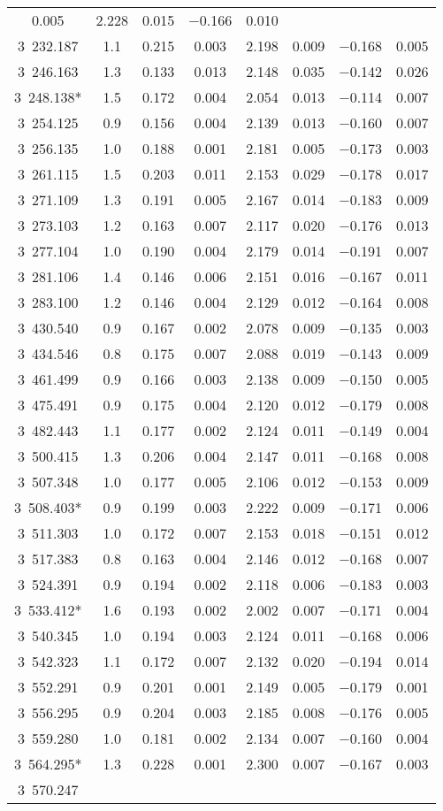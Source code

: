 \begin{table}
\begin{tabular}{cccccccc}
0.005 & 2.228 & 0.015 & $-$0.166 & 0.010 \\ 3~232.187 & 1.1 & 0.215 & 0.003 & 2.198 & 0.009 & $-$0.168 & 0.005 \\ 3~246.163 & 1.3 & 0.133 & 0.013 & 2.148 & 0.035 & $-$0.142 & 0.026 \\ 3~248.138* & 1.5 & 0.172 & 0.004 & 2.054 & 0.013 & $-$0.114 & 0.007 \\ 3~254.125 & 0.9 & 0.156 & 0.004 & 2.139 & 0.013 & $-$0.160 & 0.007 \\ 3~256.135 & 1.0 & 0.188 & 0.001 & 2.181 & 0.005 & $-$0.173 & 0.003 \\ 3~261.115 & 1.5 & 0.203 & 0.011 & 2.153 & 0.029 & $-$0.178 & 0.017 \\ 3~271.109 & 1.3 & 0.191 & 0.005 & 2.167 & 0.014 & $-$0.183 & 0.009 \\ 3~273.103 & 1.2 & 0.163 & 0.007 & 2.117 & 0.020 & $-$0.176 & 0.013 \\ 3~277.104 & 1.0 & 0.190 & 0.004 & 2.179 & 0.014 & $-$0.191 & 0.007 \\ 3~281.106 & 1.4 & 0.146 & 0.006 & 2.151 & 0.016 & $-$0.167 & 0.011 \\ 3~283.100 & 1.2 & 0.146 & 0.004 & 2.129 & 0.012 & $-$0.164 & 0.008 \\ 3~430.540 & 0.9 & 0.167 & 0.002 & 2.078 & 0.009 & $-$0.135 & 0.003 \\ 3~434.546 & 0.8 & 0.175 & 0.007 & 2.088 & 0.019 & $-$0.143 & 0.009 \\ 3~461.499 & 0.9 & 0.166 & 0.003 & 2.138 & 0.009 & $-$0.150 & 0.005 \\ 3~475.491 & 0.9 & 0.175 & 0.004 & 2.120 & 0.012 & $-$0.179 & 0.008 \\ 3~482.443 & 1.1 & 0.177 & 0.002 & 2.124 & 0.011 & $-$0.149 & 0.004 \\ 3~500.415 & 1.3 & 0.206 & 0.004 & 2.147 & 0.011 & $-$0.168 & 0.008 \\ 3~507.348 & 1.0 & 0.177 & 0.005 & 2.106 & 0.012 & $-$0.153 & 0.009 \\ 3~508.403* & 0.9 & 0.199 & 0.003 & 2.222 & 0.009 & $-$0.171 & 0.006 \\ 3~511.303 & 1.0 & 0.172 & 0.007 & 2.153 & 0.018 & $-$0.151 & 0.012 \\ 3~517.383 & 0.8 & 0.163 & 0.004 & 2.146 & 0.012 & $-$0.168 & 0.007 \\ 3~524.391 & 0.9 & 0.194 & 0.002 & 2.118 & 0.006 & $-$0.183 & 0.003 \\ 3~533.412* & 1.6 & 0.193 & 0.002 & 2.002 & 0.007 & $-$0.171 & 0.004 \\ 3~540.345 & 1.0 & 0.194 & 0.003 & 2.124 & 0.011 & $-$0.168 & 0.006 \\ 3~542.323 & 1.1 & 0.172 & 0.007 & 2.132 & 0.020 & $-$0.194 & 0.014 \\ 3~552.291 & 0.9 & 0.201 & 0.001 & 2.149 & 0.005 & $-$0.179 & 0.001 \\ 3~556.295 & 0.9 & 0.204 & 0.003 & 2.185 & 0.008 & $-$0.176 & 0.005 \\ 3~559.280 & 1.0 & 0.181 & 0.002 & 2.134 & 0.007 & $-$0.160 & 0.004 \\ 3~564.295* & 1.3 & 0.228 & 0.001 & 2.300 & 0.007 & $-$0.167 & 0.003 \\ 3~570.247 & 
\end{tabular}
\end{table}
